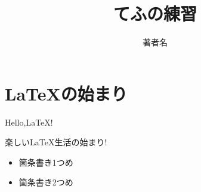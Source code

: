 \documentclass[a4paper]{jsarticle}
\title{てふの練習}
\author{著者名}
\begin{document}
\maketitle
\section{\LaTeX の始まり}
Hello,\LaTeX !

楽しい\LaTeX 生活の始まり!

\begin{itemize}
\item 箇条書き1つめ
\item 箇条書き2つめ
\end{itemize}
\end{document}
